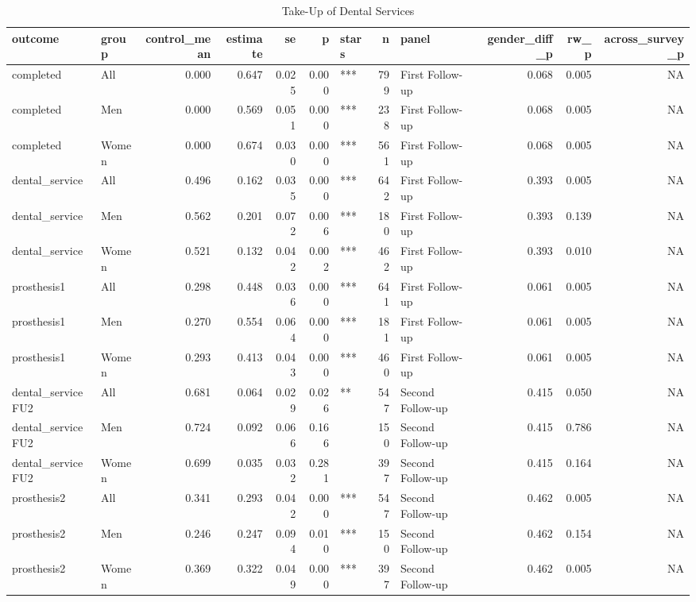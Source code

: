 \begin{table}

\caption{Take-Up of Dental Services}
\centering
\begin{tabular}[t]{llrrrrlrlrrr}
\toprule
outcome & group & control\_mean & estimate & se & p & stars & n & panel & gender\_diff\_p & rw\_p & across\_survey\_p\\
\midrule
completed & All & 0.000 & 0.647 & 0.025 & 0.000 & *** & 799 & First Follow-up & 0.068 & 0.005 & NA\\
completed & Men & 0.000 & 0.569 & 0.051 & 0.000 & *** & 238 & First Follow-up & 0.068 & 0.005 & NA\\
completed & Women & 0.000 & 0.674 & 0.030 & 0.000 & *** & 561 & First Follow-up & 0.068 & 0.005 & NA\\
dental\_service & All & 0.496 & 0.162 & 0.035 & 0.000 & *** & 642 & First Follow-up & 0.393 & 0.005 & NA\\
dental\_service & Men & 0.562 & 0.201 & 0.072 & 0.006 & *** & 180 & First Follow-up & 0.393 & 0.139 & NA\\
\addlinespace
dental\_service & Women & 0.521 & 0.132 & 0.042 & 0.002 & *** & 462 & First Follow-up & 0.393 & 0.010 & NA\\
prosthesis1 & All & 0.298 & 0.448 & 0.036 & 0.000 & *** & 641 & First Follow-up & 0.061 & 0.005 & NA\\
prosthesis1 & Men & 0.270 & 0.554 & 0.064 & 0.000 & *** & 181 & First Follow-up & 0.061 & 0.005 & NA\\
prosthesis1 & Women & 0.293 & 0.413 & 0.043 & 0.000 & *** & 460 & First Follow-up & 0.061 & 0.005 & NA\\
dental\_serviceFU2 & All & 0.681 & 0.064 & 0.029 & 0.026 & ** & 547 & Second Follow-up & 0.415 & 0.050 & NA\\
\addlinespace
dental\_serviceFU2 & Men & 0.724 & 0.092 & 0.066 & 0.166 &  & 150 & Second Follow-up & 0.415 & 0.786 & NA\\
dental\_serviceFU2 & Women & 0.699 & 0.035 & 0.032 & 0.281 &  & 397 & Second Follow-up & 0.415 & 0.164 & NA\\
prosthesis2 & All & 0.341 & 0.293 & 0.042 & 0.000 & *** & 547 & Second Follow-up & 0.462 & 0.005 & NA\\
prosthesis2 & Men & 0.246 & 0.247 & 0.094 & 0.010 & *** & 150 & Second Follow-up & 0.462 & 0.154 & NA\\
prosthesis2 & Women & 0.369 & 0.322 & 0.049 & 0.000 & *** & 397 & Second Follow-up & 0.462 & 0.005 & NA\\
\bottomrule
\end{tabular}
\end{table}
